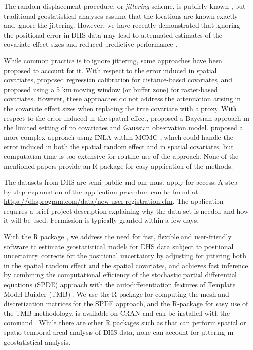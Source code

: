The random displacement procedure, or \emph{jittering} scheme, is publicly known \citep{DHSspatial07}, but traditional geostatistical analyses assume that the locations are known exactly and ignore the jittering. However, we have recently demonstrated that ignoring the positional error in DHS data may lead to attenuated estimates of the covariate effect sizes and reduced predictive performance \citep{altay2022covariates}. 

While common practice is to ignore jittering, some approaches have been proposed to account for it. With respect to the error induced in spatial covariates, \citet{warren2016influenceOne} proposed regression calibration for distance-based covariates, and \citet{perez2013guidelines,perez2016influence} proposed using a 5 km moving window (or buffer zone) for raster-based covariates. However, these approaches do not address the attenuation arising in the covariate effect sizes when replacing the true covariate with a proxy. With respect to the error induced in the spatial effect, \citet{fanshawe2011spatial} proposed a Bayesian approach in the limited setting of no covariates and Gaussian observation model. \citet{wilson2021estimation} proposed a more complex approach using INLA-within-MCMC \citep{rue2009approximate, gomez2018markov}, which could handle the error induced in both the spatial random effect and in spatial covariates, but computation time is too extensive for routine use of the approach. None of the mentioned papers provide an R package for easy application of the methods.

The datasets from DHS are semi-public and one must apply for access. A step-by-step explanation of the application procedure can be found at \url{https://dhsprogram.com/data/new-user-registration.cfm}. The application requires a brief project description  explaining why the data set is needed and how it will be used. Permission is typically granted within a few days.

With the R package , we address the need for fast, flexible and user-friendly software to estimate geostatistical models for DHS data subject to positional uncertainty.  corrects for the positional uncertainty by adjusting for jittering both in the spatial random effect and the spatial covariates, and achieves fast inference by combining the computational efficiency of the stochastic partial differential equations (SPDE) approach \citep{Lindgren:etal:11} with the autodifferentiation features of Template Model Builder (TMB) \citep{tmb}. We use the R-package  \citep{fmesherPackage} for computing the mesh and discretization matrices for the SPDE approach, and the R-package  for easy use of the TMB methodology.  is available on CRAN \citep{Rmain} and can be installed with the command . While there are other R packages such as  \citep{li2020space,summerPackage} that can perform spatial or spatio-temporal areal analysis of DHS data, none can account for jittering in geostatistical analysis.



